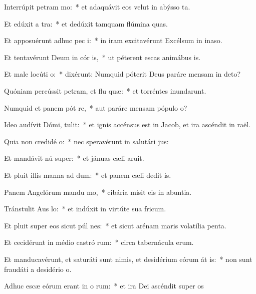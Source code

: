 \item Interrúpit petram  mo:~* et adaquávit eos velut in abýsso ta.
\item Et edúxit a  tra:~* et dedúxit tamquam flúmina quas.
\item Et apposuérunt adhuc pec i:~* in iram excitavérunt Excélsum in inaso.
\item Et tentavérunt Deum in cór is,~* ut péterent escas animábus is.
\item Et male locúti   o:~* dixérunt: Numquid póterit Deus paráre mensam in deto?
\item Quóniam percússit petram, et flu quæ:~* et torréntes inundarunt.
\item Numquid et panem pót re,~* aut paráre mensam pópulo o?
\item Ideo audívit Dómi,  tulit:~* et ignis accénsus est in Jacob, et ira ascéndit in raël.
\item Quia non credidé  o:~* nec speravérunt in salutári jus:
\item Et mandávit nú super:~* et jánuas cæli aruit.
\item Et pluit illis manna ad dum:~* et panem cæli dedit is.
\item Panem Angelórum mandu mo,~* cibária misit eis in abuntia.
\item Tránstulit Aus  lo:~* et indúxit in virtúte sua fricum.
\item Et pluit super eos sicut púl nes:~* et sicut arénam maris volatília penta.
\item Et cecidérunt in médio castró rum:~* circa tabernácula erum.
\item Et manducavérunt, et saturáti sunt nimis, et desidérium eórum át is:~* non sunt fraudáti a desidério o.
\item Adhuc escæ eórum erant in o rum:~* et ira Dei ascéndit super os
